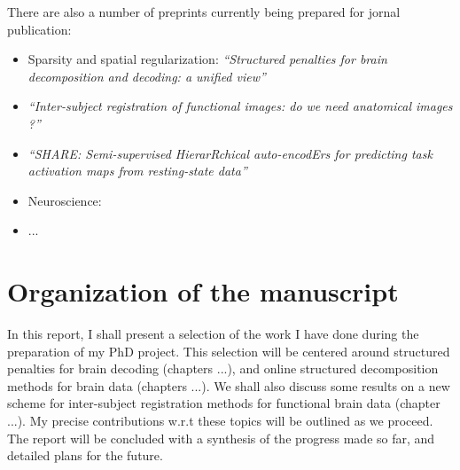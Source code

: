 There are also a number of preprints currently being prepared for jornal publication:

\begin{shaded}
\begin{itemize}
  \item{Sparsity and spatial regularization:}
     \textit{``Structured penalties for brain decomposition and decoding: a unified view''}
   \item \textit{``Inter-subject registration of functional images: do we need anatomical images ?''}
   \item \textit{``SHARE: Semi-supervised HierarRchical auto-encodErs for predicting task activation maps
     from resting-state data''}
 \item{Neuroscience:}
   \item ...
\end{itemize}
\end{shaded}


\section{Organization of the manuscript}
In this report, I shall present a selection of the work I have done during the preparation of my PhD project. This selection will be centered around structured penalties for brain decoding (chapters ...), and online structured decomposition methods for brain data (chapters ...). We shall also discuss some results on a new scheme for inter-subject registration methods for functional brain data (chapter ...).
My precise contributions w.r.t these topics will be outlined  as we proceed.
The report will be concluded with a synthesis of the progress made so far, and detailed plans for
the future.

